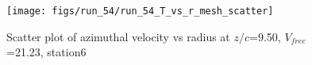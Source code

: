 \begin{figure}[H]
\centering
\texttt{[image: figs/run\_54/run\_54\_T\_vs\_r\_mesh\_scatter]}
\caption{Scatter plot of azimuthal velocity vs radius at $z/c$=9.50, $V_{free}$=21.23, station6}
\label{fig:run_54_T_vs_r_mesh_scatter}
\end{figure}


